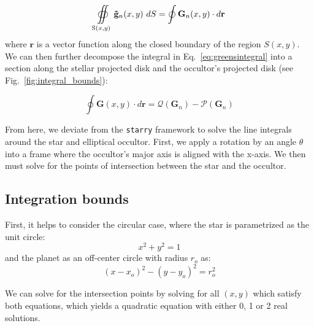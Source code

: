 \documentclass[twocolumn]{aastex631}
\begin{document}
\begin{equation} \label{eq:greensintegral}
   \oiint\limits_{\mathrm{S}(x,y)} \mathbf{\tilde{g}}_n(x,y)\ dS \\
   = \oint \mathbf{G}_n(x,y) \cdot d\mathbf{r}
\end{equation}
where $\mathbf{r}$ is a vector function along the closed boundary of the region $S(x,y)$. We can then further decompose the integral in Eq.~\ref{eq:greensintegral} into a section along the stellar projected disk and the occultor's projected disk (see Fig.~\ref{fig:integral_bounds}):

\begin{equation} \label{eq:pandq}
    \oint \mathbf{G}(x,y) \cdot d\mathbf{r} = \mathcal{Q}(\mathbf{G}_n) - \mathcal{P}(\mathbf{G}_n)
\end{equation}

From here, we deviate from the \texttt{starry} framework to solve the line integrals around the star and elliptical occultor. First, we apply a rotation by an angle $\theta$ into a frame where the occultor's major axis is aligned with the x-axis. We then must solve for the points of intersection between the star and the occultor. 

\subsection{Integration bounds}
First, it helps to consider the circular case, where the star is parametrized as the unit circle:
\begin{equation} \label{eq:unitcircle}
x^2 + y^2 = 1
\end{equation}
and the planet as an off-center circle with radius $r_{o}$ as:
\begin{equation} \label{eq:circularplanet}
(x-x_o)^2-(y-y_o)^2 = r_o^2
\end{equation}

We can solve for the intersection points by solving for all $(x,y)$ which satisfy both equations, which yields a quadratic equation with either 0, 1 or 2 real solutions.
\end{document}
